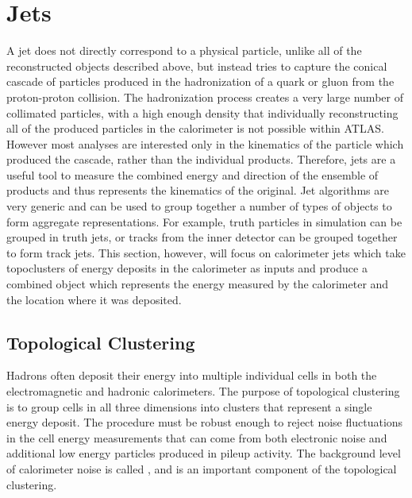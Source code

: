 
\section{Jets}
\label{sec:jets}

A jet does not directly correspond to a physical particle, unlike all of the reconstructed objects described above, but instead tries to capture the conical cascade of particles produced in the hadronization of a quark or gluon from the proton-proton collision.
The hadronization process creates a very large number of collimated particles, with a high enough density that individually reconstructing all of the produced particles in the calorimeter is not possible within \ac{ATLAS}.
However most analyses are interested only in the kinematics of the particle which produced the cascade, rather than the individual products.
Therefore, jets are a useful tool to measure the combined energy and direction of the ensemble of products and thus represents the kinematics of the original.
Jet algorithms are very generic and can be used to group together a number of types of objects to form aggregate representations.
For example, truth particles in simulation can be grouped in truth jets, or tracks from the inner detector can be grouped together to form track jets. 
This section, however, will focus on calorimeter jets which take topoclusters of energy deposits in the calorimeter as inputs and produce a combined object which represents the energy measured by the calorimeter and the location where it was deposited.

\subsection{Topological Clustering}

Hadrons often deposit their energy into multiple individual cells in both the electromagnetic and hadronic calorimeters.
The purpose of topological clustering is to group cells in all three dimensions into clusters that represent a single energy deposit.
The procedure must be robust enough to reject noise fluctuations in the cell energy measurements that can come from both electronic noise and additional low energy particles produced in pileup activity.
The background level of calorimeter noise is called \signoise, and is an important component of the topological clustering.

